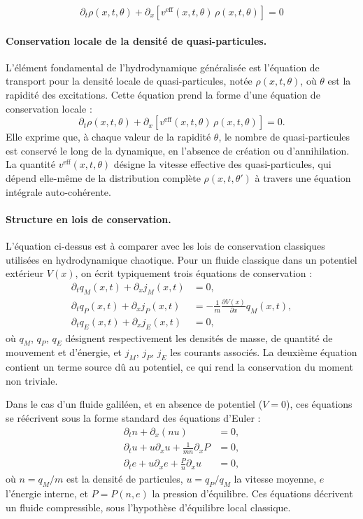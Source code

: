 {\color{blue}
\[
\partial_t \rho(x,t,\theta) + \partial_x \left[ v^{\mathrm{eff}}(x,t,\theta)\, \rho(x,t,\theta) \right] = 0
\]
}


\paragraph{Conservation locale de la densité de quasi-particules.}
L’élément fondamental de l’hydrodynamique généralisée est l’équation de transport pour la densité locale de quasi-particules, notée $\rho(x,t,\theta)$, où $\theta$ est la rapidité des excitations. Cette équation prend la forme d’une équation de conservation locale :
\[
\partial_t \rho(x,t,\theta) + \partial_x \left[ v^{\mathrm{eff}}(x,t,\theta)\, \rho(x,t,\theta) \right] = 0.
\]
Elle exprime que, à chaque valeur de la rapidité $\theta$, le nombre de quasi-particules est conservé le long de la dynamique, en l'absence de création ou d’annihilation. La quantité $v^{\mathrm{eff}}(x,t,\theta)$ désigne la vitesse effective des quasi-particules, qui dépend elle-même de la distribution complète $\rho(x,t,\theta')$ à travers une équation intégrale auto-cohérente.

\paragraph{Structure en lois de conservation.}
L’équation ci-dessus est à comparer avec les lois de conservation classiques utilisées en hydrodynamique chaotique. Pour un fluide classique dans un potentiel extérieur $V(x)$, on écrit typiquement trois équations de conservation :
\[
\begin{aligned}
\partial_t q_M(x,t) + \partial_x j_M(x,t) &= 0, \\
\partial_t q_P(x,t) + \partial_x j_P(x,t) &= -\frac{1}{m} \frac{\partial V(x)}{\partial x} q_M(x,t), \\
\partial_t q_E(x,t) + \partial_x j_E(x,t) &= 0,
\end{aligned}
\]
où $q_M$, $q_P$, $q_E$ désignent respectivement les densités de masse, de quantité de mouvement et d’énergie, et $j_M$, $j_P$, $j_E$ les courants associés. La deuxième équation contient un terme source dû au potentiel, ce qui rend la conservation du moment non triviale.

Dans le cas d’un fluide galiléen, et en absence de potentiel ($V = 0$), ces équations se réécrivent sous la forme standard des équations d’Euler :
\[
\begin{aligned}
\partial_t n + \partial_x(nu) &= 0, \\
\partial_t u + u \partial_x u + \frac{1}{mn} \partial_x P &= 0, \\
\partial_t e + u \partial_x e + \frac{P}{n} \partial_x u &= 0,
\end{aligned}
\]
où $n = q_M/m$ est la densité de particules, $u = q_P/q_M$ la vitesse moyenne, $e$ l’énergie interne, et $P = P(n,e)$ la pression d’équilibre. Ces équations décrivent un fluide compressible, sous l’hypothèse d’équilibre local classique.

